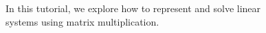 \documentclass[preview]{standalone}
\begin{document}
\begin{center}
In this tutorial, we explore how to represent and solve linear \\ systems using matrix multiplication.
\end{center}
\end{document}
